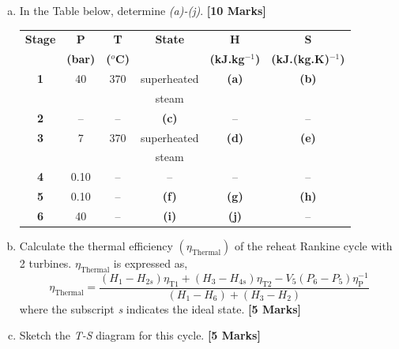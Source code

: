\documentclass[calculator,steamtables]{exam}
\newcommand{\frc}{\displaystyle\frac}
\begin{document}
\begin{question}
\begin{enumerate}[(a)]
\item In the Table below, determine {\it (a)-(j)}. {\bf [10 Marks]}\\
\begin{center}
\begin{tabular} {||c | c c c c c || }
\hline\hline
{\bf Stage} & {\bf P}    & {\bf T}        & {\bf State}    & {\bf H}             & {\bf S}                  \\
            & {\bf (bar)}& {\bf ($^{o}$C)} &               & {\bf (kJ.kg$^{-1}$)} & {\bf (kJ.(kg.K)$^{-1}$)} \\
\hline\hline
 {\bf 1 }   & 40         & 370            &   superheated  & {\bf (a)}           & {\bf (b)}                 \\
            &            &                &   steam        &                     &                           \\
 {\bf 2 }   &  --        &  --            &     {\bf (c)}  & --                  &   --                      \\
 {\bf 3 }   & 7          & 370            &   superheated  & {\bf (d)}           & {\bf (e)}                 \\
            &            &                &   steam        &                     &                           \\
 {\bf 4 }   & 0.10       & --             &     --         & --                   & --                      \\
 {\bf 5 }   & 0.10       & --             &   {\bf (f)}    & {\bf (g)}           & {\bf (h)}                 \\
 {\bf 6 }   & 40         & --             &   {\bf (i)}    & {\bf (j)}           & --                       \\

\hline\hline
\end{tabular}
\end{center}


\item Calculate the thermal efficiency $\left(\eta_{\text{Thermal}}\right)$ of the reheat Rankine cycle with 2 turbines. $\eta_{\text{Thermal}}$ is expressed as, 
\begin{displaymath}
\eta_{\text{Thermal}} = \frc{ \left(H_{1}-H_{2s}\right)\eta_{\text{T1}} + \left(H_{3}-H_{4s}\right)\eta_{\text{T2}} - V_{5}\left(P_{6}-P_{5}\right)\eta_{\text{P}}^{-1}} {\left(H_{1}-H_{6}\right)+\left(H_{3}-H_{2}\right)}
\end{displaymath}
where the subscript {\it s} indicates the ideal state. {\bf [5 Marks]}

\item Sketch the {\it T-S} diagram for this cycle. {\bf [5 Marks]}

\end{enumerate}

\end{question}
\end{document}
